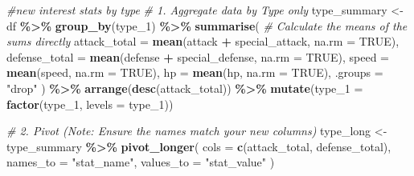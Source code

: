 \documentclass[
]{article}
\newenvironment{Shaded}{\begin{snugshade}}{\end{snugshade}}
\newcommand{\AttributeTok}[1]{\textcolor[rgb]{0.13,0.29,0.53}{#1}}
\newcommand{\CommentTok}[1]{\textcolor[rgb]{0.56,0.35,0.01}{\textit{#1}}}
\newcommand{\ConstantTok}[1]{\textcolor[rgb]{0.56,0.35,0.01}{#1}}
\newcommand{\FunctionTok}[1]{\textcolor[rgb]{0.13,0.29,0.53}{\textbf{#1}}}
\newcommand{\NormalTok}[1]{#1}
\newcommand{\OtherTok}[1]{\textcolor[rgb]{0.56,0.35,0.01}{#1}}
\newcommand{\SpecialCharTok}[1]{\textcolor[rgb]{0.81,0.36,0.00}{\textbf{#1}}}
\newcommand{\StringTok}[1]{\textcolor[rgb]{0.31,0.60,0.02}{#1}}
\begin{document}
\begin{Shaded}
\begin{Highlighting}[]
\CommentTok{\#new interest stats by type}
\CommentTok{\# 1. Aggregate data by Type only}
\NormalTok{type\_summary }\OtherTok{\textless{}{-}}\NormalTok{ df }\SpecialCharTok{\%\textgreater{}\%}
  \FunctionTok{group\_by}\NormalTok{(type\_1) }\SpecialCharTok{\%\textgreater{}\%}
  \FunctionTok{summarise}\NormalTok{(}
    \CommentTok{\# Calculate the means of the sums directly}
    \AttributeTok{attack\_total  =} \FunctionTok{mean}\NormalTok{(attack }\SpecialCharTok{+}\NormalTok{ special\_attack, }\AttributeTok{na.rm =} \ConstantTok{TRUE}\NormalTok{),}
    \AttributeTok{defense\_total =} \FunctionTok{mean}\NormalTok{(defense }\SpecialCharTok{+}\NormalTok{ special\_defense, }\AttributeTok{na.rm =} \ConstantTok{TRUE}\NormalTok{),}
    \AttributeTok{speed         =} \FunctionTok{mean}\NormalTok{(speed, }\AttributeTok{na.rm =} \ConstantTok{TRUE}\NormalTok{),}
    \AttributeTok{hp            =} \FunctionTok{mean}\NormalTok{(hp, }\AttributeTok{na.rm =} \ConstantTok{TRUE}\NormalTok{),}
    \AttributeTok{.groups =} \StringTok{"drop"}
\NormalTok{  ) }\SpecialCharTok{\%\textgreater{}\%}
  \FunctionTok{arrange}\NormalTok{(}\FunctionTok{desc}\NormalTok{(attack\_total)) }\SpecialCharTok{\%\textgreater{}\%}
  \FunctionTok{mutate}\NormalTok{(}\AttributeTok{type\_1 =} \FunctionTok{factor}\NormalTok{(type\_1, }\AttributeTok{levels =}\NormalTok{ type\_1))}

\CommentTok{\# 2. Pivot (Note: Ensure the names match your new columns)}
\NormalTok{type\_long }\OtherTok{\textless{}{-}}\NormalTok{ type\_summary }\SpecialCharTok{\%\textgreater{}\%}
  \FunctionTok{pivot\_longer}\NormalTok{(}
    \AttributeTok{cols =} \FunctionTok{c}\NormalTok{(attack\_total, defense\_total),}
    \AttributeTok{names\_to =} \StringTok{"stat\_name"}\NormalTok{,}
    \AttributeTok{values\_to =} \StringTok{"stat\_value"}
\NormalTok{  )}


\end{Highlighting}
\end{Shaded}
\end{document}
